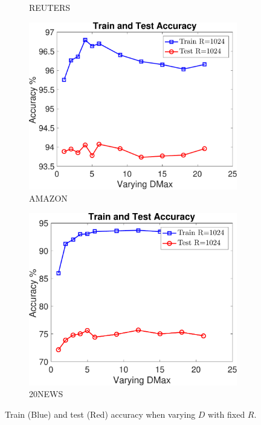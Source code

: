 \documentclass[11pt,a4paper]{article}
\newcommand{\1}{\boldsymbol{1}}
\begin{document}
\begin{figure}[htb]
\begin{subfigure}[b]{0.23\textwidth}
      \caption{REUTERS}
      \label{App:fig:exptsA_varyingD_r8}
     	\end{subfigure}
		\begin{subfigure}[b]{0.23\textwidth}
      \includegraphics[width=\textwidth]{Graphs/wmdk_varyingD/amazon_Accu_VaryingD_CV_R1024_dataSplit1-eps-converted-to.pdf}
      \caption{AMAZON}
      \label{App:fig:exptsA_varyingD_amazon}
      \end{subfigure}
		\begin{subfigure}[b]{0.23\textwidth}
      \includegraphics[width=\textwidth]{Graphs/wmdk_varyingD/20ng2_500_Accu_VaryingD_CV_R1024_dataSplit1-eps-converted-to.pdf}
      \caption{20NEWS}
      \label{App:fig:exptsA_varyingD_20ng2_500}
      \end{subfigure}
\caption{Train (Blue) and test (Red) accuracy when varying $D$ with fixed $R$.}
\label{App:fig:exptsA_varyingD}
\end{figure}
\end{document}
